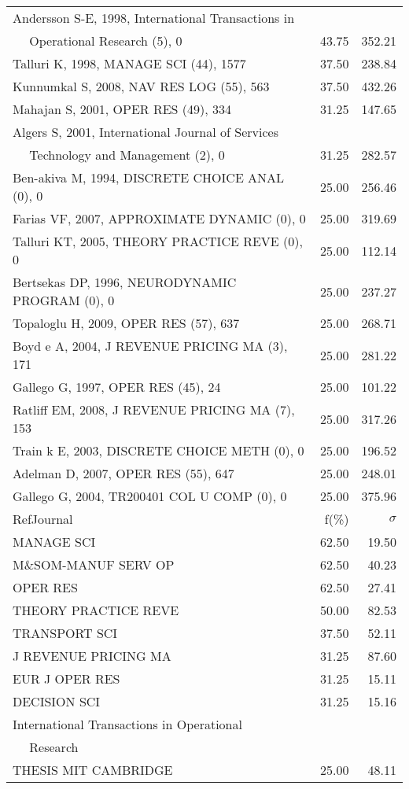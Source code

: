 \documentclass[a4paper,11pt]{report}
\begin{document}
\begin{landscape}
\begin{table}[!ht]
{\begin{tabular}{|l r r|}
Andersson S-E, 1998, International Transactions in &  & \\
$\quad$ Operational Research (5), 0 & 43.75 & 352.21\\
Talluri K, 1998, MANAGE SCI (44), 1577 & 37.50 & 238.84\\
Kunnumkal S, 2008, NAV RES LOG (55), 563 & 37.50 & 432.26\\
Mahajan S, 2001, OPER RES (49), 334 & 31.25 & 147.65\\
Algers S, 2001, International Journal of Services &  & \\
$\quad$ Technology and Management (2), 0 & 31.25 & 282.57\\
Ben-akiva M, 1994, DISCRETE CHOICE ANAL (0), 0 & 25.00 & 256.46\\
Farias VF, 2007, APPROXIMATE DYNAMIC (0), 0 & 25.00 & 319.69\\
Talluri KT, 2005, THEORY PRACTICE REVE (0), 0 & 25.00 & 112.14\\
Bertsekas DP, 1996, NEURODYNAMIC PROGRAM (0), 0 & 25.00 & 237.27\\
Topaloglu H, 2009, OPER RES (57), 637 & 25.00 & 268.71\\
Boyd e A, 2004, J REVENUE PRICING MA (3), 171 & 25.00 & 281.22\\
Gallego G, 1997, OPER RES (45), 24 & 25.00 & 101.22\\
Ratliff EM, 2008, J REVENUE PRICING MA (7), 153 & 25.00 & 317.26\\
Train k E, 2003, DISCRETE CHOICE METH (0), 0 & 25.00 & 196.52\\
Adelman D, 2007, OPER RES (55), 647 & 25.00 & 248.01\\
Gallego G, 2004, TR200401 COL U COMP (0), 0 & 25.00 & 375.96\\
\hline
\hline
RefJournal & f(\%) & $\sigma$\\
\hline
MANAGE SCI & 62.50 & 19.50\\
M\&SOM-MANUF SERV OP & 62.50 & 40.23\\
OPER RES & 62.50 & 27.41\\
THEORY PRACTICE REVE & 50.00 & 82.53\\
TRANSPORT SCI & 37.50 & 52.11\\
J REVENUE PRICING MA & 31.25 & 87.60\\
EUR J OPER RES & 31.25 & 15.11\\
DECISION SCI & 31.25 & 15.16\\
International Transactions in Operational &  & \\
$\quad$ Research &  & \\
THESIS MIT CAMBRIDGE & 25.00 & 48.11\\
\hline
\end{tabular}
}
\end{table}


\end{landscape}
\end{document}
